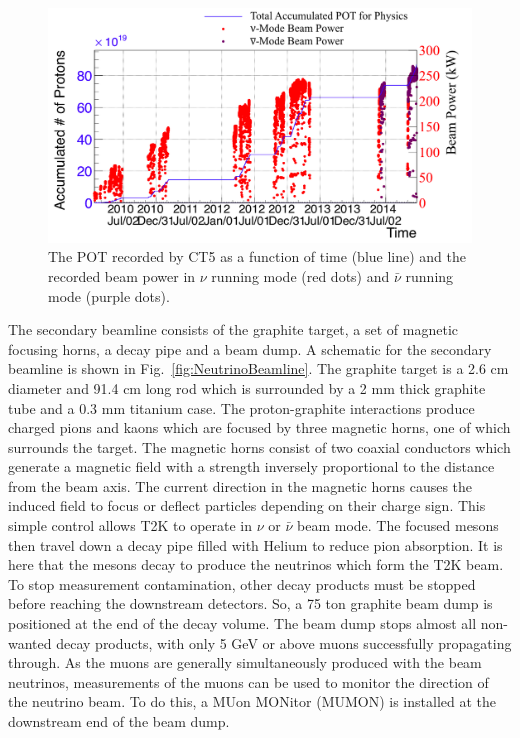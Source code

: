 \begin{figure}
  \centering
  \includegraphics[width=15cm]{images/t2k/pot_history.png}
  \caption{The POT recorded by CT5 as a function of time (blue line) and the recorded beam power in $\nu$ running mode (red dots) and $\bar{\nu}$ running mode (purple dots).}
  \label{fig:POTHistory}
\end{figure}
\newline
The secondary beamline consists of the graphite target, a set of magnetic focusing horns, a decay pipe and a beam dump.  A schematic for the secondary beamline is shown in Fig.~\ref{fig:NeutrinoBeamline}.  The graphite target is a 2.6 cm diameter and 91.4 cm long rod which is surrounded by a 2 mm thick graphite tube and a 0.3 mm titanium case.  The proton-graphite interactions produce charged pions and kaons which are focused by three magnetic horns, one of which surrounds the target.  The magnetic horns consist of two coaxial conductors which generate a magnetic field with a strength inversely proportional to the distance from the beam axis.  The current direction in the magnetic horns causes the induced field to focus or deflect particles depending on their charge sign.  This simple control allows T2K to operate in $\nu$ or $\bar{\nu}$ beam mode.  The focused mesons then travel down a decay pipe filled with Helium to reduce pion absorption.  It is here that the mesons decay to produce the neutrinos which form the T2K beam.  To stop measurement contamination, other decay products must be stopped before reaching the downstream detectors.  So, a 75 ton graphite beam dump is positioned at the end of the decay volume.  The beam dump stops almost all non-wanted decay products, with only 5 GeV or above muons successfully propagating through.  As the muons are generally simultaneously produced with the beam neutrinos, measurements of the muons can be used to monitor the direction of the neutrino beam.  To do this, a MUon MONitor (MUMON) is installed at the downstream end of the beam dump.

